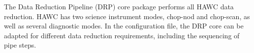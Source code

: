 The Data Reduction Pipeline (DRP) core package performs all HAWC data
reduction. HAWC has two science instrument modes, chop-nod and
chop-scan, as well as several diagnostic modes. In the configuration
file, the DRP core can be adapted for different data reduction
requirements, including the sequencing of pipe steps.

\begin{figure}[!ht]
\begin{minipage}{\textwidth}
\leavevmode \centering
{}
\hfil
\hfil
{}
\hfil
{}
\end{minipage}


\end{figure}
